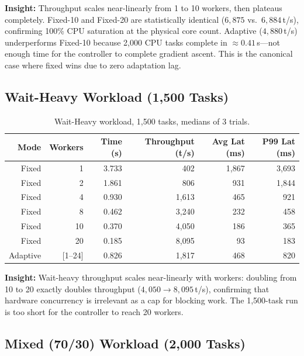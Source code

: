 \documentclass[12pt,a4paper]{article}
\begin{document}
\textbf{Insight:}
Throughput scales near-linearly from 1 to 10 workers, then plateaus
completely.
Fixed-10 and Fixed-20 are statistically identical ($6,875$ vs.\
$6,884$\,t/s), confirming 100\% CPU saturation at the physical core count.
Adaptive ($4,880$\,t/s) underperforms Fixed-10 because 2,000 CPU tasks
complete in $\approx 0.41$\,s---not enough time for the controller to
complete gradient ascent.
This is the canonical case where fixed wins due to zero adaptation lag.

\subsection{Wait-Heavy Workload (1,500 Tasks)}

\begin{table}[H]
\centering
\caption{Wait-Heavy workload, 1,500 tasks, medians of 3 trials.}
\begin{tabular}{rrrrrr}
\toprule
\textbf{Mode} & \textbf{Workers} & \textbf{Time (s)}
  & \textbf{Throughput (t/s)} & \textbf{Avg Lat (ms)} & \textbf{P99 Lat (ms)} \\
\midrule
Fixed &  1 & 3.733 &   402 & 1,867 & 3,693 \\
Fixed &  2 & 1.861 &   806 &   931 & 1,844 \\
Fixed &  4 & 0.930 & 1,613 &   465 &   921 \\
Fixed &  8 & 0.462 & 3,240 &   232 &   458 \\
Fixed & 10 & 0.370 & 4,050 &   186 &   365 \\
Fixed & 20 & 0.185 & 8,095 &    93 &   183 \\
\rowcolor{rowblue}
Adaptive & [1--24] & 0.826 & 1,817 & 468 & 820 \\
\bottomrule
\end{tabular}
\label{tab:wait}
\end{table}

\textbf{Insight:}
Wait-heavy throughput scales near-linearly with workers: doubling from 10
to 20 exactly doubles throughput ($4,050 \to 8,095$\,t/s), confirming that
hardware concurrency is irrelevant as a cap for blocking work.
The 1,500-task run is too short for the controller to reach 20 workers.

\subsection{Mixed (70/30) Workload (2,000 Tasks)}
\end{document}

